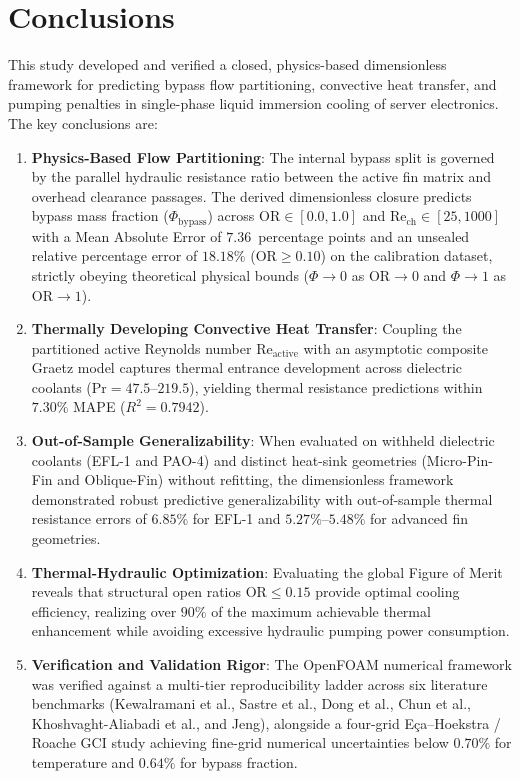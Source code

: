 
\section{Conclusions}
\label{sec:conclusions}

This study developed and verified a closed, physics-based dimensionless framework for predicting bypass flow partitioning, convective heat transfer, and pumping penalties in single-phase liquid immersion cooling of server electronics. The key conclusions are:

\begin{enumerate}
\item \textbf{Physics-Based Flow Partitioning}: The internal bypass split is governed by the parallel hydraulic resistance ratio between the active fin matrix and overhead clearance passages. The derived dimensionless closure predicts bypass mass fraction ($\Phi_{\mathrm{bypass}}$) across $\mathrm{OR} \in [0.0, 1.0]$ and $\mathrm{Re}_{\mathrm{ch}} \in [25, 1000]$ with a Mean Absolute Error of $7.36$~percentage points and an unsealed relative percentage error of $\mathbf{18.18\%}$ ($\mathrm{OR} \ge 0.10$) on the calibration dataset, strictly obeying theoretical physical bounds ($\Phi \to 0$ as $\mathrm{OR} \to 0$ and $\Phi \to 1$ as $\mathrm{OR} \to 1$).
\item \textbf{Thermally Developing Convective Heat Transfer}: Coupling the partitioned active Reynolds number $\mathrm{Re}_{\mathrm{active}}$ with an asymptotic composite Graetz model captures thermal entrance development across dielectric coolants ($\mathrm{Pr} = 47.5\text{--}219.5$), yielding thermal resistance predictions within $\mathbf{7.30\%}$ MAPE ($R^2 = 0.7942$).
\item \textbf{Out-of-Sample Generalizability}: When evaluated on withheld dielectric coolants (EFL-1 and PAO-4) and distinct heat-sink geometries (Micro-Pin-Fin and Oblique-Fin) without refitting, the dimensionless framework demonstrated robust predictive generalizability with out-of-sample thermal resistance errors of $\mathbf{6.85\%}$ for EFL-1 and $\mathbf{5.27\%\text{--}5.48\%}$ for advanced fin geometries.
\item \textbf{Thermal-Hydraulic Optimization}: Evaluating the global Figure of Merit reveals that structural open ratios $\mathrm{OR} \le 0.15$ provide optimal cooling efficiency, realizing over $90\%$ of the maximum achievable thermal enhancement while avoiding excessive hydraulic pumping power consumption.
\item \textbf{Verification and Validation Rigor}: The OpenFOAM numerical framework was verified against a multi-tier reproducibility ladder across six literature benchmarks (Kewalramani et al., Sastre et al., Dong et al., Chun et al., Khoshvaght-Aliabadi et al., and Jeng), alongside a four-grid E\c{c}a--Hoekstra / Roache GCI study achieving fine-grid numerical uncertainties below $0.70\%$ for temperature and $0.64\%$ for bypass fraction.
\end{enumerate}
